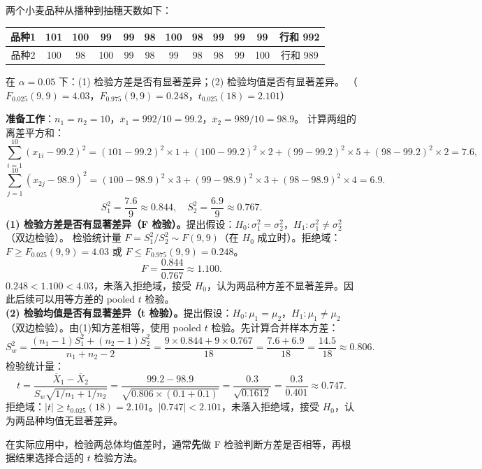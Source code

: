 \documentclass[lang=cn,11pt]{elegantbook}
\begin{document}
\begin{exercise}\label{exer:9-f-test}
两个小麦品种从播种到抽穗天数如下：
\begin{center}
\begin{tabular}{ccccccccccc|c}
\toprule
品种1 & 101 & 100 & 99 & 99 & 98 & 100 & 98 & 99 & 99 & 99 & 行和 992 \\
\midrule
品种2 & 100 & 98 & 100 & 99 & 98 & 99 & 98 & 98 & 99 & 100 & 行和 989 \\
\bottomrule
\end{tabular}
\end{center}
在 \(\alpha=0.05\) 下：(1) 检验方差是否有显著差异；(2) 检验均值是否有显著差异。
（\(F_{0.025}(9,9)=4.03\)，\(F_{0.975}(9,9)=0.248\)，\(t_{0.025}(18)=2.101\)）
\end{exercise}
\begin{solution}
\textbf{准备工作}：\(n_1=n_2=10\)，\(\overline{x}_1=992/10=99.2\)，\(\overline{x}_2=989/10=98.9\)。
计算两组的离差平方和：
\[
\sum_{i=1}^{10}(x_{1i}-99.2)^2 = (101{-}99.2)^2\!\times\!1 + (100{-}99.2)^2\!\times\!2 + (99{-}99.2)^2\!\times\!5 + (98{-}99.2)^2\!\times\!2 = 7.6,
\]
\[
\sum_{j=1}^{10}(x_{2j}-98.9)^2 = (100{-}98.9)^2\!\times\!3 + (99{-}98.9)^2\!\times\!3 + (98{-}98.9)^2\!\times\!4 = 6.9.
\]
\[
S_1^2 = \frac{7.6}{9} \approx 0.844,\quad S_2^2 = \frac{6.9}{9} \approx 0.767.
\]
\textbf{(1) 检验方差是否有显著差异（F 检验）。}提出假设：\(H_0\colon \sigma_1^2=\sigma_2^2\)，\(H_1\colon \sigma_1^2\neq\sigma_2^2\)（双边检验）。
检验统计量 \(F = S_1^2/S_2^2 \sim F(9,9)\)（在 \(H_0\) 成立时）。拒绝域：\(F \geq F_{0.025}(9,9)=4.03\) 或 \(F \leq F_{0.975}(9,9)=0.248\)。
\[
F = \frac{0.844}{0.767} \approx 1.100.
\]
\(0.248 < 1.100 < 4.03\)，未落入拒绝域，接受 \(H_0\)，认为两品种方差不显著差异。因此后续可以用等方差的 pooled \(t\) 检验。\\
\textbf{(2) 检验均值是否有显著差异（t 检验）。}提出假设：\(H_0\colon \mu_1=\mu_2\)，\(H_1\colon \mu_1\neq\mu_2\)（双边检验）。由(1)知方差相等，使用 pooled \(t\) 检验。先计算合并样本方差：
\[
S_w^2 = \frac{(n_1-1)S_1^2+(n_2-1)S_2^2}{n_1+n_2-2} = \frac{9\times0.844+9\times0.767}{18} = \frac{7.6+6.9}{18} = \frac{14.5}{18} \approx 0.806.
\]
检验统计量：
\[
t = \frac{\overline{X}_1-\overline{X}_2}{S_w\sqrt{1/n_1+1/n_2}} = \frac{99.2-98.9}{\sqrt{0.806\times(0.1+0.1)}} = \frac{0.3}{\sqrt{0.1612}} = \frac{0.3}{0.401} \approx 0.747.
\]
拒绝域：\(|t| \geq t_{0.025}(18)=2.101\)。\(|0.747| < 2.101\)，未落入拒绝域，接受 \(H_0\)，认为两品种均值无显著差异。
\begin{note}
在实际应用中，检验两总体均值差时，通常\textbf{先}做 F 检验判断方差是否相等，再根据结果选择合适的 \(t\) 检验方法。
\end{note}
\end{solution}
\end{document}
